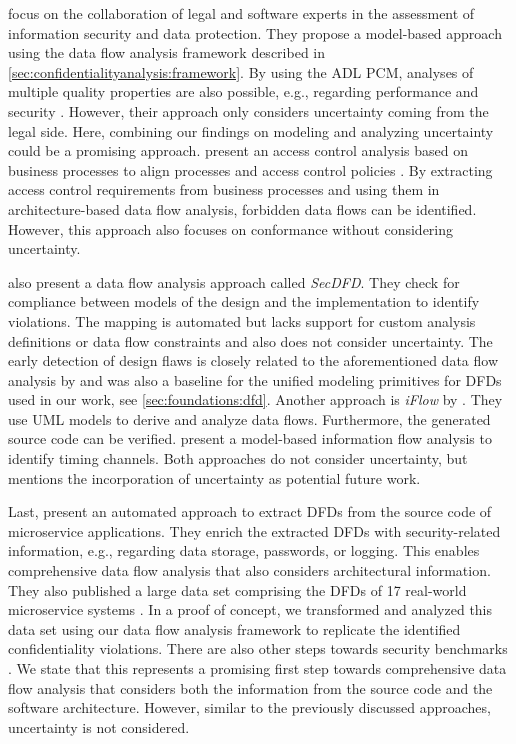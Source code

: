 \textcite{boltz_model-based_2022} focus on the collaboration of legal and software experts in the assessment of information security and data protection.
They propose a model-based approach using the data flow analysis framework \cite{boltz_extensible_2024} described in \autoref{sec:confidentialityanalysis:framework}.
By using the \acf{ADL} \ac{PCM}, analyses of multiple quality properties are also possible, e.g., regarding performance and security \cite{boltz_modeling_2024}.
However, their approach only considers uncertainty coming from the legal side.
Here, combining our findings on modeling and analyzing uncertainty could be a promising approach.
\textcite{pilipchuk_architectural_2021} present an access control analysis based on business processes to align processes and access control policies \cite{pilipchuk_aligning_2018}.
By extracting access control requirements from business processes and using them in architecture-based data flow analysis, forbidden data flows can be identified.
However, this approach also focuses on conformance without considering uncertainty.

\textcite{peldszus_secure_2019} also present a data flow analysis approach called \emph{SecDFD}.
They check for compliance between models of the design and the implementation to identify violations.
The mapping is automated but lacks support for custom analysis definitions or data flow constraints and also does not consider uncertainty.
The early detection of design flaws \cite{tuma_automating_2020,tuma_flaws_2019} is closely related to the aforementioned data flow analysis by \textcite{seifermann_detecting_2022} and was also a baseline for the unified modeling primitives for \acp{DFD} used in our work, see \autoref{sec:foundations:dfd}.
Another approach is \emph{iFlow} by \textcite{katkalov_model-driven_2013}.
They use \ac{UML} models to derive and analyze data flows.
Furthermore, the generated source code can be verified.
\textcite{gerking_model_2018} present a model-based information flow analysis to identify timing channels.
Both approaches do not consider uncertainty, but \textcite{gerking_model-driven_2020} mentions the incorporation of uncertainty as potential future work.

Last, \textcite{schneider_automatic_2023} present an automated approach to extract \acp{DFD} from the source code of microservice applications.
They enrich the extracted \acp{DFD} with security-related information, e.g., regarding data storage, passwords, or logging.
This enables comprehensive data flow analysis that also considers architectural information.
They also published a large data set comprising the \acp{DFD} of 17 real-world microservice systems \cite{schneider_microsecend_2023}.
In a proof of concept, we transformed and analyzed this data set using our data flow analysis framework \cite{boltz_extensible_2024} to replicate the identified confidentiality violations.
There are also other steps towards security benchmarks \cite{bambhore_tukaram_towards_2022}.
We state that this represents a promising first step towards comprehensive data flow analysis that considers both the information from the source code and the software architecture.
However, similar to the previously discussed approaches, uncertainty is not considered. 


